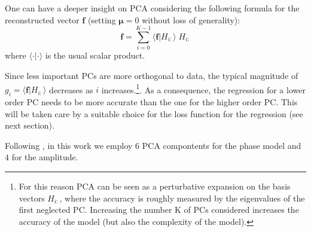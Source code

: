 \documentclass[twocolumn,showpacs,preprintnumbers,nofootinbib,prd,
superscriptaddress,10pt]{revtex4-1}
\begin{document}
One can have a deeper insight on PCA considering the following formula for the reconstructed vector $\mathbf{f}$ (setting $\boldsymbol{\mu}=0$ without loss of generality):
\begin{equation} \label{eq:perturbative_exp}
	\mathbf{f} = \sum_{i=0}^{K-1} \langle \mathbf{f} | H_{i:} \rangle \; H_{i:}
\end{equation}
%
where $\langle \cdot | \cdot \rangle$ is the usual scalar product.

Since less important PCs are more orthogonal to data, the typical magnitude of $g_i = \langle \mathbf{f} | H_{i:} \rangle$ decreases as $i$ increases.\footnote{For this reason PCA can be seen as a perturbative expansion on the basis vectors $H_{i:}$, where the accuracy is roughly measured by the eigenvalues of the first neglected PC. Increasing the number K of PCs considered increases the accuracy of the model (but also the complexity of the model).}.
As a consequence, the regression for a lower order PC needs to be more accurate than the one for the higher order PC. This will be taken care by a suitable choice for the loss function for the regression (see next section).

Following \cite{Schmidt:2020yuu}, in this work we employ $6$ PCA compontents for the phase model and $4$ for the amplitude.
\end{document}
